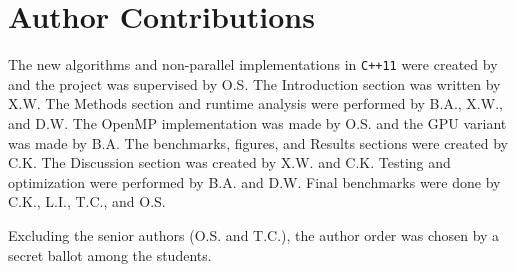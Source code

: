 \documentclass[10pt]{article}
\begin{document}
\section*{Author Contributions}
The new algorithms and non-parallel implementations in {\tt C++11}
were created by and the project was supervised by O.S. The
Introduction section was written by X.W. The Methods section and
runtime analysis were performed by B.A., X.W., and D.W. The OpenMP
implementation was made by O.S. and the GPU variant was made by
B.A. The benchmarks, figures, and Results sections were created by
C.K. The Discussion section was created by X.W. and C.K. Testing and
optimization were performed by B.A. and D.W. Final benchmarks were
done by C.K., L.I., T.C., and O.S.\newline

\noindent Excluding the senior authors (O.S. and T.C.), the author
order was chosen by a secret ballot among the students.



\end{document}
